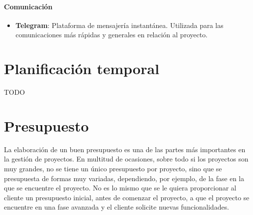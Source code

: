 \paragraph{Comunicación}
\begin{itemize}
    \item \textbf{Telegram}: Plataforma de mensajería instantánea. Utilizada para las comunicaciones más rápidas y generales en relación al proyecto.
\end{itemize}

\section{Planificación temporal}
TODO

\section{Presupuesto}
La elaboración de un buen presupuesto es una de las partes más importantes en la gestión de proyectos. En multitud de ocasiones, sobre todo si los proyectos son muy grandes, no se tiene un único presupuesto por proyecto, sino que se presupuesta de formas muy variadas, dependiendo, por ejemplo, de la fase en la que se encuentre el proyecto. No es lo mismo que se le quiera proporcionar al cliente un presupuesto inicial, antes de comenzar el proyecto, a que el proyecto se encuentre en una fase avanzada y el cliente solicite nuevas funcionalidades.


